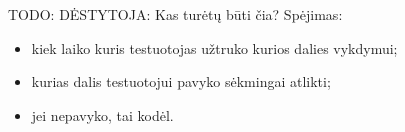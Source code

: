 



TODO: DĖSTYTOJA: Kas turėtų būti čia? Spėjimas:
\begin{itemize}
  \item kiek laiko kuris testuotojas užtruko kurios dalies vykdymui;
  \item kurias dalis testuotojui pavyko sėkmingai atlikti;
  \item jei nepavyko, tai kodėl.
\end{itemize}
